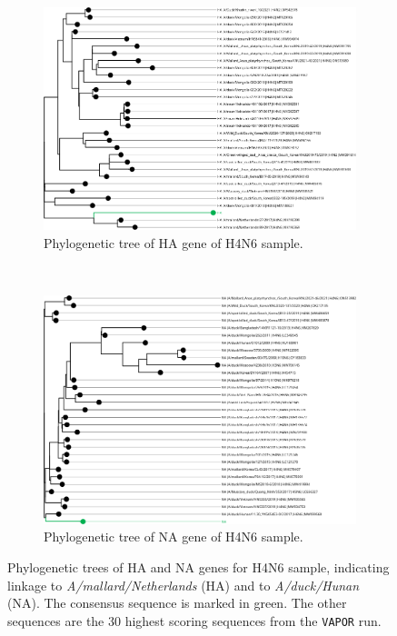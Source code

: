 \begin{figure}
    \centering
    \begin{subfigure}[]{0.5\textheight}
        \includegraphics[width=1.0\textwidth]{media/4-aiv-s4-tree-ha.png}
        \caption{Phylogenetic tree of HA gene of H4N6 sample.}
		\label{fig:apx-aiv-trees-s4-ha}
    \end{subfigure} \\
	\vspace*{20pt}
    \begin{subfigure}[]{0.5\textheight}
        \includegraphics[width=1.0\textwidth]{media/4-aiv-s4-tree-na.png}
        \caption{Phylogenetic tree of NA gene of H4N6 sample.}
		\label{fig:apx-aiv-trees-s4-na}
    \end{subfigure} 
	\caption[Phylogenetic trees of HA and NA genes for H4N6 sample.]{Phylogenetic trees of HA and NA genes for H4N6 sample, indicating linkage to \textit{A/mallard/Netherlands} (HA) and to \textit{A/duck/Hunan} (NA). The consensus sequence is marked in green. The other sequences are the 30 highest scoring sequences from the \texttt{VAPOR} run.}
\label{fig:apx-aiv-trees-s4}
\end{figure}

